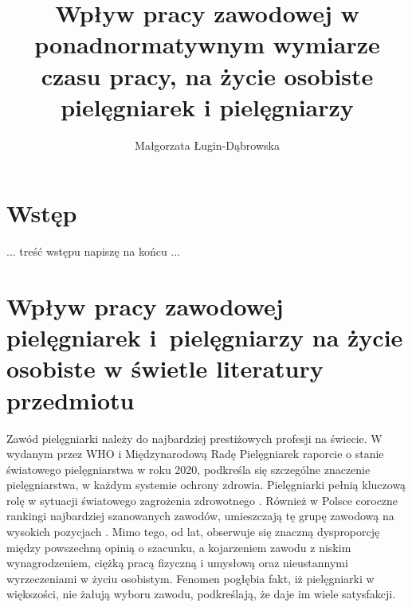 \documentclass[a4paper,12pt,twoside,openany]{report}
\title{Wpływ pracy zawodowej w ponadnormatywnym wymiarze czasu pracy, na życie osobiste pielęgniarek i pielęgniarzy}
\author{Małgorzata Ługin-Dąbrowska}
\begin{document}
\sloppy
\maketitle



\chapter*{Wstęp}
... treść wstępu napiszę na końcu ...



\chapter{Wpływ pracy zawodowej pielęgniarek i~pielęgniarzy na życie osobiste w świetle literatury przedmiotu}
Zawód pielęgniarki należy do najbardziej prestiżowych profesji na świecie. W wydanym przez WHO i Międzynarodową Radę Pielęgniarek raporcie o stanie światowego pielęgniarstwa w roku 2020, podkreśla się szczególne znaczenie pielęgniarstwa, w każdym systemie ochrony zdrowia. Pielęgniarki pełnią kluczową rolę w sytuacji światowego zagrożenia zdrowotnego \cite{who}.  Również w Polsce coroczne rankingi najbardziej szanowanych zawodów, umieszczają tę grupę zawodową na wysokich pozycjach \cite{rap}. Mimo tego, od lat, obserwuje się znaczną dysproporcję między powszechną opinią o szacunku, a kojarzeniem zawodu z niskim wynagrodzeniem, ciężką pracą fizyczną i umysłową oraz nieustannymi wyrzeczeniami w życiu osobistym. Fenomen pogłębia fakt, iż pielęgniarki w większości, nie żałują wyboru zawodu, podkreślają, że daje  im wiele satysfakcji.

\end{document}
